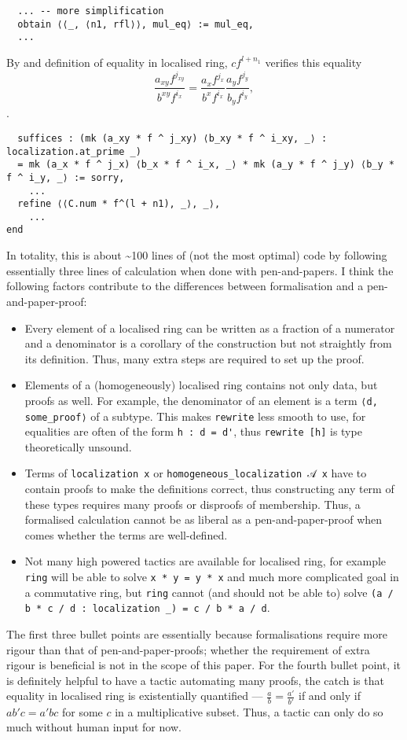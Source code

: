 \documentclass[a4paper,UKenglish,cleveref, autoref, thm-restate]{lipics-v2021}
\begin{document}
\begin{lstlisting}
  ... -- more simplification
  obtain ⟨⟨_, ⟨n1, rfl⟩⟩, mul_eq⟩ := mul_eq,
  ...
\end{lstlisting}
By  and definition of equality in localised ring, $c f^{l+n_1}$ verifies this equality $$\frac{a_{xy}f^{j_{xy}}}{b^{xy}f^{i_x}}=\frac{a_x f^{j_x}}{b^x f^{i_x}} \frac{a_y f^{j_y}}{b_y f^{i_y}},$$.
\begin{lstlisting}
  suffices : (mk (a_xy * f ^ j_xy) ⟨b_xy * f ^ i_xy, _⟩ : localization.at_prime _) 
  = mk (a_x * f ^ j_x) ⟨b_x * f ^ i_x, _⟩ * mk (a_y * f ^ j_y) ⟨b_y * f ^ i_y, _⟩ := sorry,
    ...
  refine ⟨⟨C.num * f^(l + n1), _⟩, _⟩,
    ...
end
\end{lstlisting}
In totality, this is about \textasciitilde100 lines of (not the most optimal) code by following essentially three lines of calculation when done with pen-and-papers. I think the following factors contribute to the differences between formalisation and a pen-and-paper-proof:
\begin{itemize}
    \item Every element of a localised ring can be written as a fraction of a numerator and a denominator is a corollary of the construction but not straightly from its definition. Thus, many extra steps are required to set up the proof.
    \item Elements of a (homogeneously) localised ring contains not only data, but proofs as well. For example, the denominator of an element is a term \lstinline{⟨d, some_proof⟩} of a subtype. This makes \lstinline{rewrite} less smooth to use, for equalities are often of the form \lstinline{h : d = d'}, thus \lstinline{rewrite [h]} is type theoretically unsound.
    \item Terms of \lstinline{localization x} or \lstinline{homogeneous_localization 𝒜 x} have to contain proofs to make the definitions correct, thus constructing any term of these types requires many proofs or disproofs of membership. Thus, a formalised calculation cannot be as liberal as a pen-and-paper-proof when comes whether the terms are well-defined.
    \item Not many high powered tactics are available for localised ring, for example \lstinline{ring} will be able to solve \lstinline{x * y = y * x} and much more complicated goal in a commutative ring, but \lstinline{ring} cannot (and should not be able to) solve \lstinline{(a / b * c / d : localization _) = c / b * a / d}.
\end{itemize}
The first three bullet points are essentially because formalisations require more rigour than that of pen-and-paper-proofs; whether the requirement of extra rigour is beneficial is not in the scope of this paper. For the fourth bullet point, it is definitely helpful to have a tactic automating many proofs, the catch is that equality in localised ring is existentially quantified --- $\frac a b = \frac {a'}{b'}$ if and only if $ab' c = a' b c$ for some $c$ in a multiplicative subset. Thus, a tactic can only do so much without human input for now.
\end{document}

